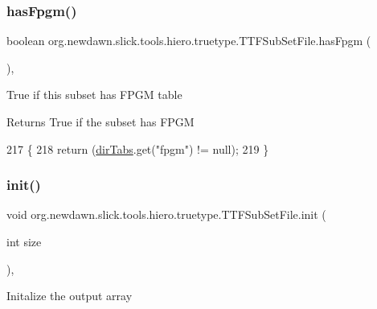 \subsubsection{\texorpdfstring{has\+Fpgm()}{hasFpgm()}}
{\footnotesize\ttfamily boolean org.\+newdawn.\+slick.\+tools.\+hiero.\+truetype.\+T\+T\+F\+Sub\+Set\+File.\+has\+Fpgm (\begin{DoxyParamCaption}{ }\end{DoxyParamCaption})\hspace{0.3cm}{\ttfamily [inline]}, {\ttfamily [private]}}

True if this subset has F\+P\+GM table

\begin{DoxyReturn}{Returns}
True if the subset has F\+P\+GM 
\end{DoxyReturn}

\begin{DoxyCode}
217                               \{
218         \textcolor{keywordflow}{return} (\mbox{\hyperlink{classorg_1_1newdawn_1_1slick_1_1tools_1_1hiero_1_1truetype_1_1_t_t_f_file_ace74820d11ce19f9c04797c2715ac728}{dirTabs}}.get(\textcolor{stringliteral}{"fpgm"}) != null);
219     \}
\end{DoxyCode}
\mbox{\label{classorg_1_1newdawn_1_1slick_1_1tools_1_1hiero_1_1truetype_1_1_t_t_f_sub_set_file_a6c3025b00ec1c60907f23d2132027d60}} 
\subsubsection{\texorpdfstring{init()}{init()}}
{\footnotesize\ttfamily void org.\+newdawn.\+slick.\+tools.\+hiero.\+truetype.\+T\+T\+F\+Sub\+Set\+File.\+init (\begin{DoxyParamCaption}\item[{int}]{size }\end{DoxyParamCaption})\hspace{0.3cm}{\ttfamily [inline]}, {\ttfamily [private]}}

Initalize the output array


